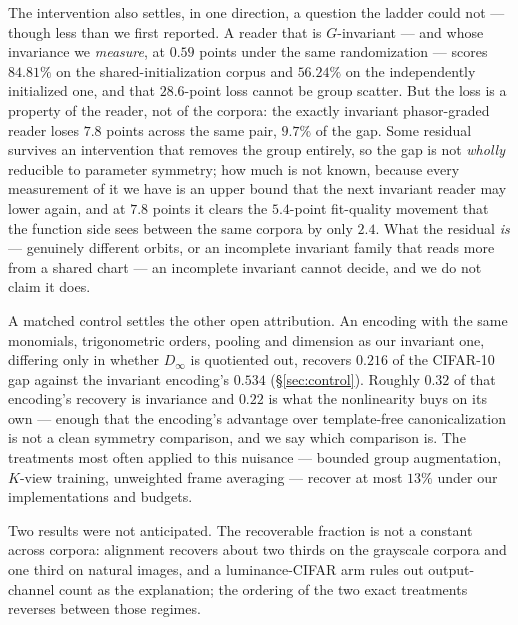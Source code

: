 \documentclass[10pt,letterpaper]{article}
\theoremstyle{definition}
\newcommand{\Dinf}{D_\infty}
\begin{document}
The intervention also settles, in one direction, a question the ladder could not --- though less
than we first reported. A reader that is $G$-invariant --- and whose invariance we \emph{measure},
at $0.59$ points under the same randomization --- scores $84.81\%$ on the shared-initialization
corpus and $56.24\%$ on the independently initialized one, and that $28.6$-point loss cannot be
group scatter. But the loss is a property of the reader, not of the corpora: the exactly invariant
phasor-graded reader loses $7.8$ points across the same pair, $9.7\%$ of the gap. Some residual
survives an intervention that removes the group entirely, so the gap is not \emph{wholly} reducible
to parameter symmetry; how much is not known, because every measurement of it we have is an upper
bound that the next invariant reader may lower again, and at $7.8$ points it clears the $5.4$-point
fit-quality movement that the function side sees between the same corpora by only $2.4$. What the
residual \emph{is} --- genuinely different orbits, or an incomplete invariant family that reads more
from a shared chart --- an incomplete invariant cannot decide, and we do not claim it does.

A matched control settles the other open attribution. An encoding with the same monomials,
trigonometric orders, pooling and dimension as our invariant one, differing only in whether $\Dinf$
is quotiented out, recovers $0.216$ of the CIFAR-10 gap against the invariant encoding's $0.534$
(\S\ref{sec:control}). Roughly $0.32$ of that encoding's recovery is invariance and $0.22$ is what
the nonlinearity buys on its own --- enough that the encoding's advantage over template-free
canonicalization is not a clean symmetry comparison, and we say which comparison is.
The treatments most often applied to this nuisance --- bounded group augmentation, $K$-view
training, unweighted frame averaging --- recover at most $13\%$ under our implementations and
budgets.

Two results were not anticipated. The recoverable fraction is not a constant across corpora:
alignment recovers about two thirds on the grayscale corpora and one third on natural images, and
a luminance-CIFAR arm rules out output-channel count as the explanation; the ordering of the two
exact treatments reverses between those regimes.
\end{document}

